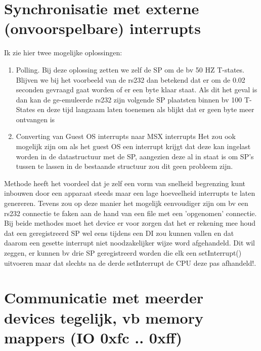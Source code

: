 \documentclass[11pt, a4paper]{report}
\begin{document}
%
%
%


\section{Synchronisatie met externe (onvoorspelbare) interrupts}

Ik zie hier twee mogelijke oplossingen:
\begin{enumerate}
\item Polling.
Bij deze oplossing zetten we zelf de SP om de bv 50 HZ T-states.
Blijven we bij het voorbeeld van de rs232 dan betekend dat er om de 0.02 seconden 
gevraagd gaat worden of er een byte klaar staat. Als dit het geval is dan kan de 
ge-emuleerde rs232 zijn volgende SP plaatsten binnen bv 100 T-States en deze tijd 
langzaam laten toenemen als blijkt dat er geen byte meer ontvangen is
\item Converting van Guest OS interrupts naar MSX interrupts
Het zou ook mogelijk zijn om als het guest OS een interrupt krijgt dat deze kan 
ingelast worden in de datastructuur met de SP, aangezien deze al in staat is om 
SP's tussen te lassen in de bestaande structuur zou dit geen probleem zijn.
\end{enumerate}

Methode heeft het voordeel dat je zelf een vorm van snelheid begrenzing kunt
inbouwen door een apparaat steeds maar een lage hoeveelheid interrupts te laten
genereren. Tevens zou op deze manier het mogelijk eenvoudiger zijn om bv een
rs232 connectie te faken aan de hand van een file met een 'opgenomen' connectie.
Bij beide methodes moet het device er voor zorgen dat het er rekening mee houd
dat een geregistreerd SP wel eens tijdens een DI zou kunnen vallen en dat daarom
een gesette interrupt niet noodzakelijker wijze word afgehandeld. Dit wil
zeggen, er kunnen bv drie SP geregistreerd worden die elk een setInterrupt()
uitvoeren maar dat slechts na de derde setInterrupt de CPU deze pas afhandeld!.


\section{Communicatie met meerder devices tegelijk, 
vb memory mappers (IO 0xfc .. 0xff)}
\end{document}
